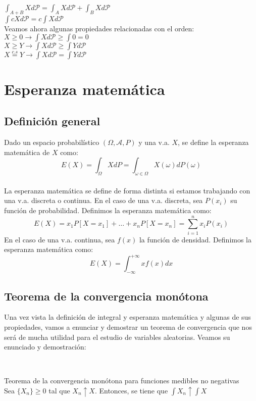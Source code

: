 $\displaystyle \int_{A+B} X d\mathcal{P} = \int_A X d\mathcal{P} + \int_B X d \mathcal{P}$\\

$\displaystyle \int cXd\mathcal{P} = c\int Xd\mathcal{P}$\\

Veamos ahora algunas propiedades relacionadas con el orden:\\

$X \geq 0 \rightarrow \displaystyle \int X d\mathcal{P} \geq \int 0 = 0$\\

$X \geq Y \rightarrow \displaystyle \int X d\mathcal{P} \geq \int Y d\mathcal{P}$\\

$\displaystyle X \stackrel{c.s}{=} Y \rightarrow \int X d\mathcal{P} = \int Y d\mathcal{P}$\\

\section{Esperanza matemática}

\subsection{Definición general}

Dado un espacio probabilístico $(\Omega, \mathcal{A}, P)$ y una v.a. $X$, se define la esperanza matemática de $X$ como:
$$E(X)=\int_{\Omega}XdP=\int_{\omega \in \Omega}{X(\omega)dP(\omega)}$$
\\

La esperanza matemática se define de forma distinta si estamos trabajando con una v.a. discreta o continua. En el caso de una v.a. discreta, sea $P(x_i)$ su función de probabilidad. Definimos la esperanza matemática como:
$$E(X)=x_1P[X=x_1]+\ldots + x_n P[X=x_n]=\sum_{i=1}^{n}{x_i P(x_i)}$$
En el caso de una v.a. continua, sea $f(x)$ la función de densidad. Definimos la esperanza matemática como:
$$E(X)=\int_{-\infty}^{+\infty} {xf(x)dx}$$

\subsection{Teorema de la convergencia monótona}

Una vez vista la definición de integral y esperanza matemática y algunas de sus propiedades, vamos a enunciar y demostrar un teorema de convergencia que nos será de mucha utilidad para el estudio de variables aleatorias. Veamos su enunciado y demostración:
\begin{theorem}
  \
  
Teorema de la convergencia monótona para funciones medibles no negativas\\

Sea $\{X_n\} \geq 0$ tal que $X_n \uparrow X$. Entonces, se tiene que $\displaystyle \int X_n \uparrow \int X$
\end{theorem}

